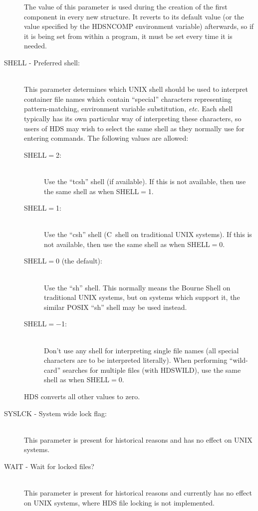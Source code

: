 \documentclass[twoside,11pt]{article}
\newcommand{\htmlref}[2]{#1}
\newcommand{\xlabel}[1]{}
\renewcommand{\_}{\texttt{\symbol{95}}}
\newcommand{\qt}[1]{``#1''}
\newcommand{\st}[1]{{\em{#1}}}
\newcommand{\qt}[1]{{\tt{"}}#1{\tt{"}}}
\begin{document}
\begin{description}
The value of this parameter is used during the creation of the first
component in every new structure.  It reverts to its default value (or
the value specified by the HDS\_NCOMP environment variable)
afterwards, so if it is being set from within a program, it must be
set every time it is needed.

\item [\xlabel{HDS_SHELL_tuning_parameter}SHELL - Preferred shell:]\mbox{}\\
This parameter determines which UNIX shell should be used to interpret
container file names which contain \qt{special} characters
representing pattern-matching, environment variable substitution,
\st{etc.} Each shell typically has its own particular way of
interpreting these characters, so users of HDS may wish to select the
same shell as they normally use for entering commands. The following
values are allowed:

\begin{description}

\item[SHELL$=$2:]\mbox{}\\
Use the \qt{tcsh} shell (if available). If this is not available, then
use the same shell as when SHELL$=$1.

\item[SHELL$=$1:]\mbox{}\\
Use the \qt{csh} shell (C~shell on traditional UNIX systems). If this
is not available, then use the same shell as when SHELL$=$0.

\item[SHELL$=$0 (the default):]\mbox{}\\
Use the \qt{sh} shell. This normally means the Bourne Shell on
traditional UNIX systems, but on systems which support it, the similar
POSIX \qt{sh} shell may be used instead.

\item[SHELL$=-$1:]\mbox{}\\
Don't use any shell for interpreting single file names (all special
characters are to be interpreted literally). When performing
\qt{wild-card} searches for multiple files (with
\htmlref{HDS\_WILD}{HDS_WILD}), use the same shell as when SHELL$=$0.

\end{description}

HDS converts all other values to zero.

\item [\xlabel{HDS_SYSLCK_tuning_parameter}SYSLCK - System wide lock flag:]\mbox{}\\
This parameter is present for historical reasons and has no effect on
UNIX systems.

\item [\xlabel{HDS_WAIT_tuning_parameter}WAIT - Wait for locked files?]\mbox{}\\
This parameter is present for historical reasons and currently has no
effect on UNIX systems, where HDS file locking is not implemented.

\end{description}
\end{document}
